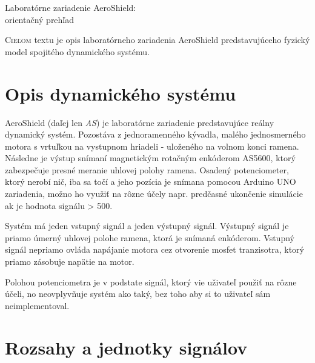 \documentclass[a4paper, 10pt, ]{article}
\begin{document}
\begin{flushleft}
    Laboratórne zariadenie AeroShield:\\ orientačný prehľad
\end{flushleft}

\bigskip

\normalsize
\normalfont

\lstset{style=mystyle}










\noindent
\lettrine[lines=1, nindent=1pt, loversize=0.0]{C}{ieľom}
textu je opis laboratórneho zariadenia AeroShield predstavujúceho fyzický model spojitého dynamického systému.


\section{Opis dynamického systému}

AeroShield (daľej len \emph{AS}) je laboratórne zariadenie predstavujúce reálny dynamický systém. Pozostáva z jednoramenného kývadla, malého jednosmerného motora s vrtuľkou na vystupnom hriadeli - uloženého na volnom konci ramena. Následne je výstup snímaní magnetickým rotačným enkóderom AS5600, ktorý zabezpečuje presné meranie uhlovej polohy ramena. Osadený potenciometer, ktorý nerobí nič, iba sa točí a jeho pozícia je snímana pomocou Arduino UNO zariadenia, možno ho využiť na rôzne účely napr. predčasné ukončenie simulácie ak je hodnota signálu > 500.

Systém má jeden vstupný signál a jeden výstupný signál. Výstupný signál je priamo úmerný uhlovej polohe ramena, ktorá je snímaná enkóderom. Vstupný signál nepriamo ovláda napájanie motora cez otvorenie mosfet tranzisotra, ktorý priamo zásobuje napätie na motor.

Polohou potenciometra je v podstate signál, ktorý vie uživateľ použiť na rôzne účeli, no neovplyvňuje systém ako taký, bez toho aby si to uživateľ sám neimplementoval.



\section{Rozsahy a jednotky signálov}
\end{document}
